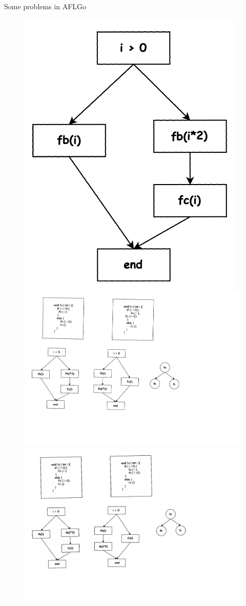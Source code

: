 \documentclass[10pt,aspectratio=43]{beamer}
\begin{document}
\begin{frame}{Some problems in AFLGo}
{\begin{figure}[htb]
\begin{minipage}[b]{0.34\linewidth}
                \includegraphics[width=0.75\linewidth]{pic/excfg1.pdf}
            \end{minipage}
            \begin{minipage}[b]{0.3\linewidth}
                \includegraphics[width=0.75\linewidth]{pic/excg.pdf}
            \end{minipage} 
            \begin{minipage}[b]{0.34\linewidth}
                \includegraphics[width=0.75\linewidth]{pic/excfg2.pdf}

\end{minipage}
\end{figure}}
\end{frame}
\end{document}
